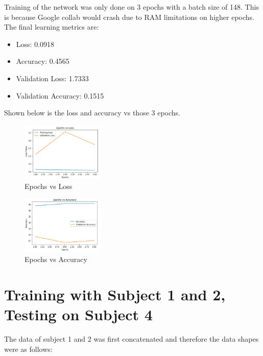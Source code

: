 \documentclass[conference]{IEEEtran}
\begin{document}
    Training of the network was only done on 3 epochs with a batch size of 148. This is because Google collab would crash due to RAM limitations on
    higher epochs. The final learning metrics are:

    \begin{itemize}
        \item Loss: 0.0918
        \item Accuracy: 0.4565
        \item Validation Loss: 1.7333
        \item Validation Accuracy: 0.1515
    \end{itemize}

    Shown below is the loss and accuracy vs those 3 epochs.
    
    \begin{figure}[H]
        \centering
        \captionsetup{justification=centering}
        \centering
            \includegraphics[width=0.35\textwidth]{44.png}
            \caption{Epochs vs Loss}
    \end{figure}

    \begin{figure}[H]
        \centering
        \captionsetup{justification=centering}
        \centering
            \includegraphics[width=0.35\textwidth]{45.png}
            \caption{Epochs vs Accuracy}
    \end{figure}

    \section{Training with Subject 1 and 2, Testing on Subject 4}

    The data of subject 1 and 2 was first concatenated and therefore the data shapes were as follows:
\end{document}
